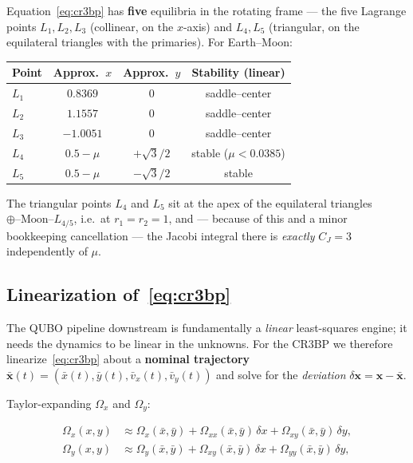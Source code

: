 \documentclass[8pt,a4paper]{article}
\newcommand{\bvec}[1]{\bm{#1}}
\newcommand{\xvec}{\bvec{x}}
\newcommand{\Omegax}{\Omega_x}
\newcommand{\Omegay}{\Omega_y}
\newcommand{\Omegaxx}{\Omega_{xx}}
\newcommand{\Omegayy}{\Omega_{yy}}
\newcommand{\Omegaxy}{\Omega_{xy}}
\theoremstyle{definition}
\theoremstyle{remark}
\begin{document}
Equation~\eqref{eq:cr3bp} has \textbf{five} equilibria in the rotating
frame --- the five Lagrange points $L_1, L_2, L_3$ (collinear, on the
$x$-axis) and $L_4, L_5$ (triangular, on the equilateral triangles
with the primaries). For Earth--Moon:

\begin{center}
\begin{tabular}{lccc}
  \toprule
  Point & Approx.\ $x$ & Approx.\ $y$ & Stability (linear) \\
  \midrule
  $L_1$ & $0.8369$ & $0$ & saddle--center \\
  $L_2$ & $1.1557$ & $0$ & saddle--center \\
  $L_3$ & $-1.0051$ & $0$ & saddle--center \\
  $L_4$ & $0.5 - \mu$ & $+\sqrt{3}/2$ & stable ($\mu < 0.0385$) \\
  $L_5$ & $0.5 - \mu$ & $-\sqrt{3}/2$ & stable \\
  \bottomrule
\end{tabular}
\end{center}

The triangular points $L_4$ and $L_5$ sit at the apex of the
equilateral triangles $\oplus\text{--}\text{Moon}\text{--}L_{4/5}$,
i.e.\ at $r_1 = r_2 = 1$, and --- because of this and a minor bookkeeping
cancellation --- the Jacobi integral there is \emph{exactly} $C_J = 3$
independently of $\mu$.

\subsection{Linearization of~\eqref{eq:cr3bp}}
\label{sec:linearization}

The QUBO pipeline downstream is fundamentally a \emph{linear}
least-squares engine; it needs the dynamics to be linear in the
unknowns. For the CR3BP we therefore linearize~\eqref{eq:cr3bp} about
a \textbf{nominal trajectory} $\bar{\xvec}(t) = (\bar x(t), \bar
y(t), \bar v_x(t), \bar v_y(t))$ and solve for the
\emph{deviation} $\delta\xvec = \xvec - \bar{\xvec}$.

Taylor-expanding $\Omegax$ and $\Omegay$:

\begin{equation}
  \begin{aligned}
    \Omegax(x, y) &\approx \Omegax(\bar x, \bar y)
       + \Omegaxx(\bar x, \bar y)\,\delta x
       + \Omegaxy(\bar x, \bar y)\,\delta y, \\
    \Omegay(x, y) &\approx \Omegay(\bar x, \bar y)
       + \Omegaxy(\bar x, \bar y)\,\delta x
       + \Omegayy(\bar x, \bar y)\,\delta y,
  \end{aligned}
\end{equation}
\end{document}
